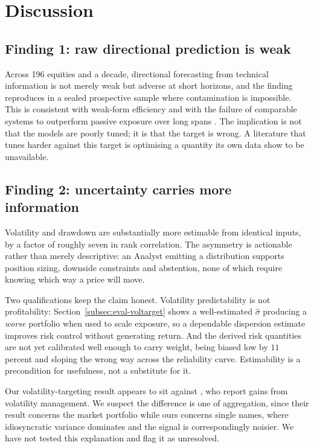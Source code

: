 \documentclass[pdflatex,sn-apa]{sn-jnl}%
\theoremstyle{thmstyleone}%
\theoremstyle{thmstyletwo}%
\theoremstyle{thmstylethree}%
\begin{document}
\section{Discussion}\label{sec:discussion}

\subsection{Finding 1: raw directional prediction is weak}\label{subsec:disc-direction}

Across 196 equities and a decade, directional forecasting from technical
information is not merely weak but adverse at short horizons, and the finding
reproduces in a sealed prospective sample where contamination is impossible.
This is consistent with weak-form efficiency \citep{fama1970efficient} and with
the failure of comparable systems to outperform passive exposure over long
spans \citep{li2025finsaber}. The implication is not that the models are poorly
tuned; it is that the target is wrong. A literature that tunes harder against
this target is optimising a quantity its own data show to be unavailable.

\subsection{Finding 2: uncertainty carries more
information}\label{subsec:disc-uncertainty}

Volatility and drawdown are substantially more estimable from identical inputs,
by a factor of roughly seven in rank correlation. The asymmetry is actionable
rather than merely descriptive: an Analyst emitting a distribution supports
position sizing, downside constraints and abstention, none of which require
knowing which way a price will move.

Two qualifications keep the claim honest. Volatility predictability is not
profitability: Section~\ref{subsec:eval-voltarget} shows a well-estimated
$\hat{\sigma}$ producing a \emph{worse} portfolio when used to scale exposure,
so a dependable dispersion estimate improves risk control without generating
return. And the derived risk quantities are not yet calibrated well enough to
carry weight, being biased low by $11$ percent and sloping the wrong way across
the reliability curve. Estimability is a precondition for usefulness, not a
substitute for it.

Our volatility-targeting result appears to sit against
\citet{moreira2017volatility}, who report gains from volatility management. We
suspect the difference is one of aggregation, since their result concerns the
market portfolio while ours concerns single names, where idiosyncratic variance
dominates and the signal is correspondingly noisier. We have not tested this
explanation and flag it as unresolved.
\end{document}
